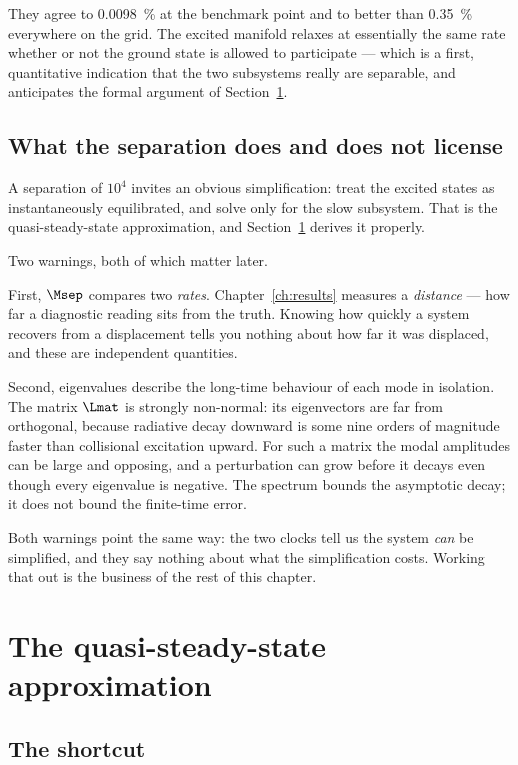 They agree to \SI{0.0098}{\percent} at the benchmark point and to better than
\SI{0.35}{\percent} everywhere on the grid. The excited manifold relaxes at
essentially the same rate whether or not the ground state is allowed to
participate --- which is a first, quantitative indication that the two subsystems
really are separable, and anticipates the formal argument of
Section~\ref{sec:qss}.

\subsection{What the separation does and does not license}

A separation of $10^{4}$ invites an obvious simplification: treat the excited
states as instantaneously equilibrated, and solve only for the slow subsystem.
That is the quasi-steady-state approximation, and Section~\ref{sec:qss} derives
it properly.

Two warnings, both of which matter later.

First, $\Msep$ compares two \emph{rates}. Chapter~\ref{ch:results} measures a
\emph{distance} --- how far a diagnostic reading sits from the truth. Knowing how
quickly a system recovers from a displacement tells you nothing about how far it
was displaced, and these are independent quantities.

Second, eigenvalues describe the long-time behaviour of each mode in isolation.
The matrix $\Lmat$ is strongly non-normal: its eigenvectors are far from
orthogonal, because radiative decay downward is some nine orders of magnitude
faster than collisional excitation upward. For such a matrix the modal
amplitudes can be large and opposing, and a perturbation can grow before it
decays even though every eigenvalue is negative. The spectrum bounds the
asymptotic decay; it does not bound the finite-time error.

Both warnings point the same way: the two clocks tell us the system \emph{can}
be simplified, and they say nothing about what the simplification costs. Working
that out is the business of the rest of this chapter.

\section{The quasi-steady-state approximation}
\label{sec:qss}

\subsection{The shortcut}


